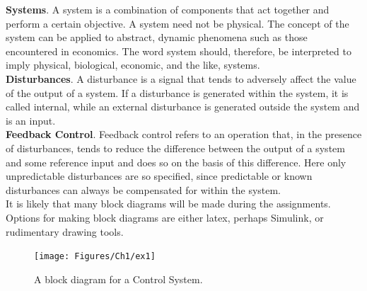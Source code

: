 \documentclass{beamer}
\begin{document}
\begin{frame}[allowframebreaks]
\hfill \newline
\textbf{Systems}. A system is a combination of components that act together and perform
a certain objective. A system need not be physical. The concept of the system can be
applied to abstract, dynamic phenomena such as those encountered in economics. The
word system should, therefore, be interpreted to imply physical, biological, economic, and
the like, systems. \\

\hfill \newline
\textbf{Disturbances}. A disturbance is a signal that tends to adversely affect the value
of the output of a system. If a disturbance is generated within the system, it is called
internal, while an external disturbance is generated outside the system and is
an input. \\

\hfill \newline
\textbf{Feedback Control}. Feedback control refers to an operation that, in the presence
of disturbances, tends to reduce the difference between the output of a system and some
reference input and does so on the basis of this difference. Here only unpredictable disturbances are so specified, since predictable or known disturbances can always be compensated for within the system. \\

\hfill \newline
It is likely that many block diagrams will be made during the assignments. Options for making block diagrams are either latex, perhaps Simulink, or rudimentary drawing tools.

\begin{figure}
	\centering
	\texttt{[image: Figures/Ch1/ex1]}
	\caption{A block diagram for a Control System.}
	\label{fig:ex1}
\end{figure}

\end{frame}

\end{document}
